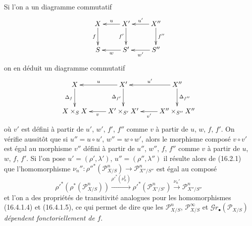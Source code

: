 \begin{env}[16.4.2]
\label{IV.16.4.2}
Si l'on a un diagramme commutatif
\[
  \xymatrix{
    X \ar[d]_-{f} & X' \ar[l]_-u \ar[d]_-{f'} &
      X'' \ar[l]_-{u'} \ar[d]^-{f''} \\
    S & S' \ar[l]^-w & S'' \ar[l]^-{w'}
  }
\]
on en déduit un diagramme commutatif
\[
  \xymatrix{
    X \ar[d]_-{\Delta_f} & X' \ar[l]_-u \ar[d]_-{\Delta_{f'}} &
      X'' \ar[l]_-{u'} \ar[d]^-{\Delta_{f''}} \\
    X\times_S X & X'\times_{S'}X' \ar[l]^-v &
      X''\times_{S''}X'' \ar[l]^-{v'}
  }
\]
où $v'$ est défini à partir de $u'$, $w'$, $f'$, $f''$ comme $v$ à partir de
$u$, $w$, $f$, $f'$. On vérifie aussitôt que si $u''=u\circ u'$,
$w''=w\circ w'$, alors le morphisme composé $v\circ v'$ est égal au morphisme
$v''$ défini à partir de $u''$, $w''$, $f$, $f''$ comme $v$ à partir de $u$,
$w$, $f$, $f'$. Si l'on pose $u'=(\rho',\lambda')$,
$u''=(\rho'',\lambda'')$ il résulte alors de (16.2.1) que l'homomorphisme
$\nu_n'':\rho''^*(\mathscr{P}_{X/S}^n)\to\mathscr{P}_{X''/S''}^n$ est égal au
composé
\[
  \rho'^*(\rho^*(\mathscr{P}_{X/S}^n))
  \xrightarrow{\rho'^*(\nu_n^\sharp)}
  \rho'^*(\mathscr{P}_{X'/S'}^n)
  \xrightarrow{\nu_n'}\mathscr{P}_{X''/S''}^n
\]
et l'on a des propriétés de transitivité analogues pour les homomorphismes
(16.4.1.4) et (16.4.1.5), ce qui permet de dire que les
$\mathscr{P}_{X/S}^n$, $\mathscr{P}_{X/S}^\infty$ et
$\mathscr{G}r_\bullet(\mathscr{P}_{X/S})$ \emph{dépendent fonctoriellement de $f$}.
\end{env}

